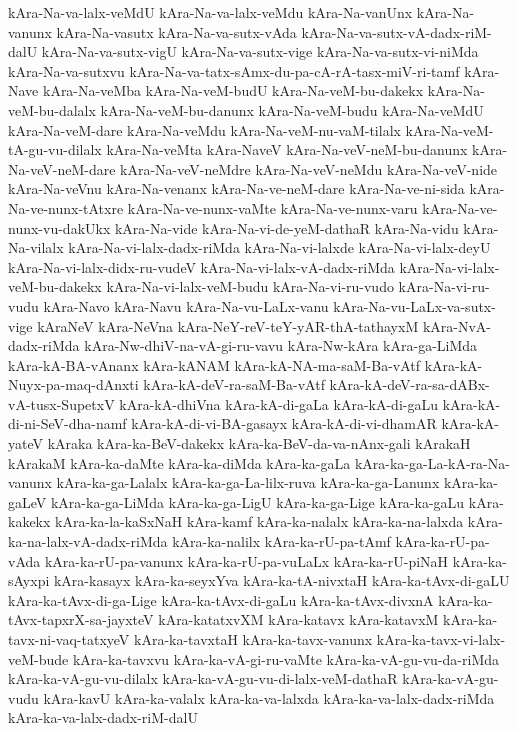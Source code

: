 {kAra-Na-va-lalx-veMdU
kAra-Na-va-lalx-veMdu
kAra-Na-vanUnx
kAra-Na-vanunx
kAra-Na-vasutx
kAra-Na-va-sutx-vAda
kAra-Na-va-sutx-vA-dadx-riM-dalU
kAra-Na-va-sutx-vigU
kAra-Na-va-sutx-vige
kAra-Na-va-sutx-vi-niMda
kAra-Na-va-sutxvu
kAra-Na-va-tatx-sAmx-du-pa-cA-rA-tasx-miV-ri-tamf
kAra-Nave
kAra-Na-veMba
kAra-Na-veM-budU
kAra-Na-veM-bu-dakekx
kAra-Na-veM-bu-dalalx
kAra-Na-veM-bu-danunx
kAra-Na-veM-budu
kAra-Na-veMdU
kAra-Na-veM-dare
kAra-Na-veMdu
kAra-Na-veM-nu-vaM-tilalx
kAra-Na-veM-tA-gu-vu-dilalx
kAra-Na-veMta
kAra-NaveV
kAra-Na-veV-neM-bu-danunx
kAra-Na-veV-neM-dare
kAra-Na-veV-neMdre
kAra-Na-veV-neMdu
kAra-Na-veV-nide
kAra-Na-veVnu
kAra-Na-venanx
kAra-Na-ve-neM-dare
kAra-Na-ve-ni-sida
kAra-Na-ve-nunx-tAtxre
kAra-Na-ve-nunx-vaMte
kAra-Na-ve-nunx-varu
kAra-Na-ve-nunx-vu-dakUkx
kAra-Na-vide
kAra-Na-vi-de-yeM-dathaR
kAra-Na-vidu
kAra-Na-vilalx
kAra-Na-vi-lalx-dadx-riMda
kAra-Na-vi-lalxde
kAra-Na-vi-lalx-deyU
kAra-Na-vi-lalx-didx-ru-vudeV
kAra-Na-vi-lalx-vA-dadx-riMda
kAra-Na-vi-lalx-veM-bu-dakekx
kAra-Na-vi-lalx-veM-budu
kAra-Na-vi-ru-vudo
kAra-Na-vi-ru-vudu
kAra-Navo
kAra-Navu
kAra-Na-vu-LaLx-vanu
kAra-Na-vu-LaLx-va-sutx-vige
kAraNeV
kAra-NeVna
kAra-NeY-reV-teY-yAR-thA-tathayxM
kAra-NvA-dadx-riMda
kAra-Nw-dhiV-na-vA-gi-ru-vavu
kAra-Nw-kAra
kAra-ga-LiMda
kAra-kA-BA-vAnanx
kAra-kANAM
kAra-kA-NA-ma-saM-Ba-vAtf
kAra-kA-Nuyx-pa-maq-dAnxti
kAra-kA-deV-ra-saM-Ba-vAtf
kAra-kA-deV-ra-sa-dABx-vA-tusx-SupetxV
kAra-kA-dhiVna
kAra-kA-di-gaLa
kAra-kA-di-gaLu
kAra-kA-di-ni-SeV-dha-namf
kAra-kA-di-vi-BA-gasayx
kAra-kA-di-vi-dhamAR
kAra-kA-yateV
kAraka
kAra-ka-BeV-dakekx
kAra-ka-BeV-da-va-nAnx-gali
kArakaH
kArakaM
kAra-ka-daMte
kAra-ka-diMda
kAra-ka-gaLa
kAra-ka-ga-La-kA-ra-Na-vanunx
kAra-ka-ga-Lalalx
kAra-ka-ga-La-lilx-ruva
kAra-ka-ga-Lanunx
kAra-ka-gaLeV
kAra-ka-ga-LiMda
kAra-ka-ga-LigU
kAra-ka-ga-Lige
kAra-ka-gaLu
kAra-kakekx
kAra-ka-la-kaSxNaH
kAra-kamf
kAra-ka-nalalx
kAra-ka-na-lalxda
kAra-ka-na-lalx-vA-dadx-riMda
kAra-ka-nalilx
kAra-ka-rU-pa-tAmf
kAra-ka-rU-pa-vAda
kAra-ka-rU-pa-vanunx
kAra-ka-rU-pa-vuLaLx
kAra-ka-rU-piNaH
kAra-ka-sAyxpi
kAra-kasayx
kAra-ka-seyxYva
kAra-ka-tA-nivxtaH
kAra-ka-tAvx-di-gaLU
kAra-ka-tAvx-di-ga-Lige
kAra-ka-tAvx-di-gaLu
kAra-ka-tAvx-divxnA
kAra-ka-tAvx-tapxrX-sa-jayxteV
kAra-katatxvXM
kAra-katavx
kAra-katavxM
kAra-ka-tavx-ni-vaq-tatxyeV
kAra-ka-tavxtaH
kAra-ka-tavx-vanunx
kAra-ka-tavx-vi-lalx-veM-bude
kAra-ka-tavxvu
kAra-ka-vA-gi-ru-vaMte
kAra-ka-vA-gu-vu-da-riMda
kAra-ka-vA-gu-vu-dilalx
kAra-ka-vA-gu-vu-di-lalx-veM-dathaR
kAra-ka-vA-gu-vudu
kAra-kavU
kAra-ka-valalx
kAra-ka-va-lalxda
kAra-ka-va-lalx-dadx-riMda
kAra-ka-va-lalx-dadx-riM-dalU
}

